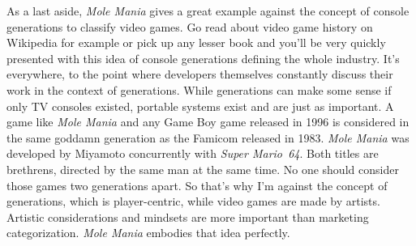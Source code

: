 \documentclass{book}
\begin{document}
As a last aside, \emph{Mole Mania} gives a great example against the concept of console generations to classify video games. Go read about video game history on Wikipedia for example or pick up any lesser book and you’ll be very quickly presented with this idea of console generations defining the whole industry. It’s everywhere, to the point where developers themselves constantly discuss their work in the context of generations. While generations can make some sense if only TV consoles existed, portable systems exist and are just as important. A game like \emph{Mole Mania} and any Game Boy game released in 1996 is considered in the same goddamn generation as the Famicom released in 1983. \emph{Mole Mania} was developed by Miyamoto concurrently with \emph{Super Mario~64}. Both titles are brethrens, directed by the same man at the same time. No one should consider those games two generations apart. So that’s why I’m against the concept of generations, which is player-centric, while video games are made by artists. Artistic considerations and mindsets are more important than marketing categorization. \emph{Mole Mania} embodies that idea perfectly.\par
\end{document}
